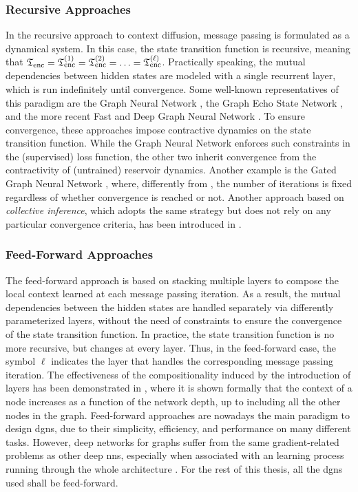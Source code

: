 \subsubsection*{Recursive Approaches}
In the recursive approach to context diffusion, message passing is formulated as a dynamical system. In this case, the state transition function is recursive, meaning that $\mathfrak{T}_{\mathrm{enc}} = \mathfrak{T}_{\mathrm{enc}}^{(1)} = \mathfrak{T}_{\mathrm{enc}}^{(2)} = \ldots = \mathfrak{T}_{\mathrm{enc}}^{(\ell)}$. Practically speaking, the mutual dependencies between hidden states are modeled with a single recurrent layer, which is run indefinitely until convergence. Some well-known representatives of this paradigm are the Graph Neural Network \citep{scarselli2009gnn}, the Graph Echo State Network \citep{gallicchio2010graphesn}, and the more recent Fast and Deep Graph Neural Network \citep{gallicchio2020fastdeepgnn}. To ensure convergence, these approaches impose contractive dynamics on the state transition function. While the Graph Neural Network enforces such constraints in the (supervised) loss function, the other two inherit convergence from the contractivity of (untrained) reservoir dynamics. Another example is the Gated Graph Neural Network \citep{li2016gatedgnn}, where, differently from \citet{scarselli2009gnn}, the number of iterations is fixed \apriori regardless of whether convergence is reached or not. Another approach based on \emph{collective inference}, which adopts the same strategy but does not rely on any particular convergence criteria, has been introduced in \citep{macskassy2007classificationnetworkdata}.

\subsubsection*{Feed-Forward Approaches}
The feed-forward approach is based on stacking multiple layers to compose the local context learned at each message passing iteration. As a result, the mutual dependencies between the hidden states are handled separately via differently parameterized layers, without the need of constraints to ensure the convergence of the state transition function. In practice, the state transition function is no more recursive, but changes at every layer. Thus, in the feed-forward case, the symbol $\ell$ indicates the layer that handles the corresponding message passing iteration. The effectiveness of the compositionality induced by the introduction of layers has been demonstrated in \citep{micheli2009nn4g}, where it is shown formally that the context of a node increases as a function of the network depth, up to including all the other nodes in the graph. Feed-forward approaches are nowadays the main paradigm to design \glspl{dgn}, due to their simplicity, efficiency, and performance on many different tasks. However, deep networks for graphs suffer from the same gradient-related problems as other deep \glspl{nn}, especially when associated with an  learning process running through the whole architecture \citep{bengio1994learninglongtermdependenciesdifficult,li2018deeperinsightgraphconvsemisupervised}. For the rest of this thesis, all the \glspl{dgn} used shall be feed-forward.

